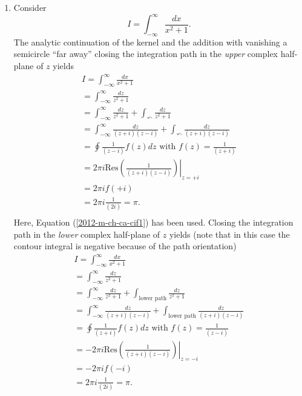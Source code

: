 {
\color{blue}
\bexample


\renewcommand{\labelenumi}{(\roman{enumi})}
\begin{enumerate}

\item  Consider   $$I=\int_{-\infty}^{\infty}\frac{dx}{x^2+1} .$$
The analytic continuation of the kernel and the addition with vanishing a semicircle ``far away'' closing the integration path
in the {\em upper} complex half-plane of $z$ yields
\begin{equation}
\begin{split}
I=\int_{-\infty}^{\infty}\frac{dx}{x^2+1} \\
     =  \int_{-\infty}^{\infty}\frac{dz}{z^2+1}  \\
     = \int_{-\infty}^{\infty}\frac{dz}{z^2+1} + \int_{\curvearrowleft} \frac{dz}{z^2+1} \\
     = \int_{-\infty}^{\infty}\frac{dz}{(z+i)(z-i)} +  \int_{\curvearrowleft} \frac{dz}{(z+i)(z-i)} \\
     = \oint\frac{1}{(z-i)} f(z) dz \textrm{ with } f(z)=\frac{1}{(z+i)} \\
     = 2\pi i \textrm{Res}\left.\left(\frac{1}{(z+i)(z-i)} \right)\right|_{z=+i} \\
     = 2\pi i f(+i)  \\
     = 2\pi i \frac{1}{(2i)}     = \pi.   \\
\end{split}
\end{equation}
Here, Equation (\ref{2012-m-ch-ca-cif1}) has been used.
Closing the integration path
in the {\em lower} complex half-plane of $z$ yields (note that in this case the contour integral is negative because of the path orientation)
\begin{equation}
\begin{split}
I=\int_{-\infty}^{\infty}\frac{dx}{x^2+1} \\
     =  \int_{-\infty}^{\infty}\frac{dz}{z^2+1}  \\
     = \int_{-\infty}^{\infty}\frac{dz}{z^2+1}  + \int_{\textrm{lower path}} \frac{dz}{z^2+1} \\
     = \int_{-\infty}^{\infty}\frac{dz}{(z+i)(z-i)} + \int_{\textrm{lower path}} \frac{dz}{(z+i)(z-i)} \\
     = \oint\frac{1}{(z+i)} f(z) dz \textrm{ with } f(z)=\frac{1}{(z-i)} \\
     = -2\pi i \textrm{Res}\left.\left(\frac{1}{(z+i)(z-i)} \right)\right|_{z=-i} \\
     = -2\pi i f(-i)  \\
     = 2\pi i \frac{1}{(2i)}       = \pi.   \\
\end{split}
\end{equation}



\end{enumerate}}
